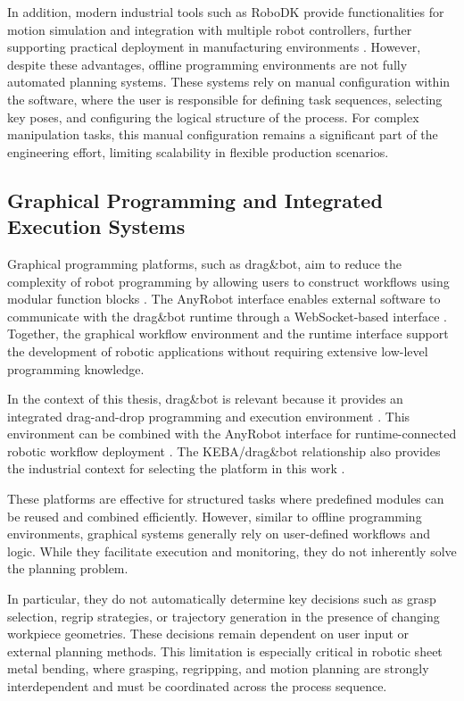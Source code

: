 In addition, modern industrial tools such as RoboDK provide functionalities for motion simulation and integration with multiple robot controllers, further supporting practical deployment in manufacturing environments \cite{RoboDK2024}. However, despite these advantages, offline programming environments are not fully automated planning systems. These systems rely on manual configuration within the software, where the user is responsible for defining task sequences, selecting key poses, and configuring the logical structure of the process. For complex manipulation tasks, this manual configuration remains a significant part of the engineering effort, limiting scalability in flexible production scenarios.

\subsection{Graphical Programming and Integrated Execution Systems}
\label{subsec:graphical-programming-integrated-execution-systems}

Graphical programming platforms, such as drag\&bot, aim to reduce the complexity of robot programming by allowing users to construct workflows using modular function blocks \cite{dragandbot_about_2026}. The AnyRobot interface enables external software to communicate with the drag\&bot runtime through a WebSocket-based interface \cite{dragandbot_anyrobot_2025}. Together, the graphical workflow environment and the runtime interface support the development of robotic applications without requiring extensive low-level programming knowledge.

In the context of this thesis, drag\&bot is relevant because it provides an integrated drag-and-drop programming and execution environment \cite{dragandbot_about_2026}. This environment can be combined with the AnyRobot interface for runtime-connected robotic workflow deployment \cite{dragandbot_anyrobot_2025}. The KEBA/drag\&bot relationship also provides the industrial context for selecting the platform in this work \cite{keba_dragandbot_2022}.

These platforms are effective for structured tasks where predefined modules can be reused and combined efficiently. However, similar to offline programming environments, graphical systems generally rely on user-defined workflows and logic. While they facilitate execution and monitoring, they do not inherently solve the planning problem.

In particular, they do not automatically determine key decisions such as grasp selection, regrip strategies, or trajectory generation in the presence of changing workpiece geometries. These decisions remain dependent on user input or external planning methods. This limitation is especially critical in robotic sheet metal bending, where grasping, regripping, and motion planning are strongly interdependent and must be coordinated across the process sequence.

